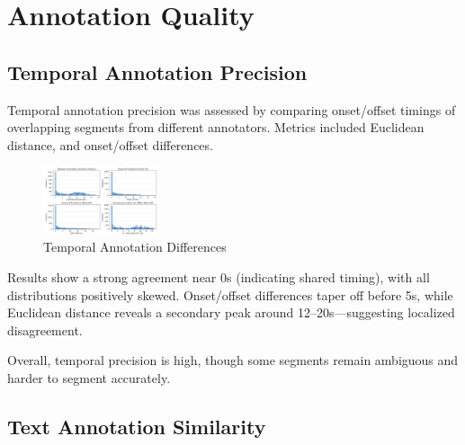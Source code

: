 \documentclass{article}
\begin{document}
\section{Annotation Quality}
\label{sec:annotation_quality}

\subsection{Temporal Annotation Precision}

Temporal annotation precision was assessed by comparing onset/offset timings of overlapping segments from different annotators. Metrics included Euclidean distance, and onset/offset differences.

\begin{figure}[H]
  \centering
  \includegraphics[width=0.3\textwidth]{figures/annotation_quality/temporal_annotation_differences.png}
  \caption{Temporal Annotation Differences}
  \label{fig:temporal_diff}
\end{figure}

Results show a strong agreement near 0s (indicating shared timing), with all distributions positively skewed. Onset/offset differences taper off before 5s, while Euclidean distance reveals a secondary peak around 12–20s—suggesting localized disagreement.

Overall, temporal precision is high, though some segments remain ambiguous and harder to segment accurately.

\subsection{Text Annotation Similarity}
\end{document}
